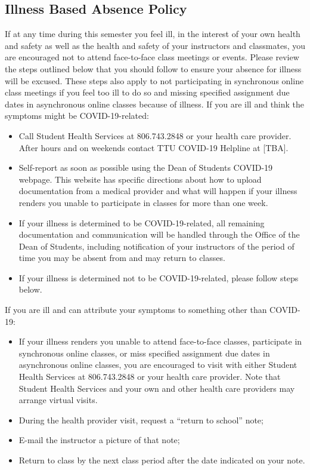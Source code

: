 \documentclass[12pt, notitlepage]{article}   	%
\begin{document}
{\subsection{Illness Based Absence Policy}
If at any time during this semester you feel ill, in the interest of your own health and 
safety as well as the health and safety of your instructors and classmates, you are 
encouraged not to attend face-to-face class meetings or events.  Please review the steps 
outlined below that you should follow to ensure your absence for illness will be excused. 
These steps also apply to not participating in synchronous online class meetings if you feel 
too ill to do so and missing specified assignment due dates in asynchronous online classes 
because of illness. If you are ill and think the symptoms might be COVID-19-related:
\begin{itemize}
	\item{Call Student Health Services at 806.743.2848 or your health care provider.  
	After hours and on weekends contact TTU COVID-19 Helpline at [TBA].}
	\item{Self-report as soon as possible using the Dean of Students COVID-19 webpage.
	This website has specific directions about how to upload documentation from a medical 
	provider and what will happen if your illness renders you unable to participate in 
	classes for more than one week.}
	\item{If your illness is determined to be COVID-19-related, all remaining 
	documentation and communication will be handled through the Office of the 
	Dean of Students, including notification of your instructors of the period of 
	time you may be absent from and may return to classes.}
	\item{If your illness is determined not to be COVID-19-related, please follow steps below.}
\end{itemize}

If you are ill and can attribute your symptoms to something other than COVID-19:
\begin{itemize}
	\item{If your illness renders you unable to attend face-to-face classes, participate 
	in synchronous online classes, or miss specified assignment due dates in asynchronous 
	online classes, you are encouraged to visit with either Student Health Services at 
	806.743.2848 or your health care provider.  Note that Student Health Services and 
	your own and other health care providers may arrange virtual visits.}
	\item{During the health provider visit, request a “return to school” note;}
	\item{E-mail the instructor a picture of that note;}
	\item{Return to class by the next class period after the date indicated on your note.}
\end{itemize}

}
\end{document}
